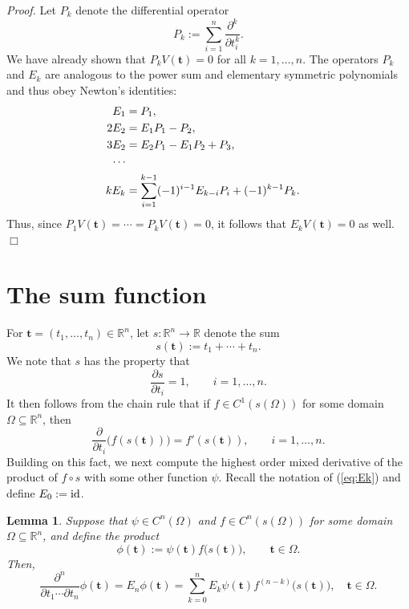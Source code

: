 \documentclass[12pt]{article}
\newcommand{\RR}{\mathbb{R}}
\def\bft{\mathbf{t}}
\newtheorem{lemma}{Lemma}
\newenvironment{proof}{\begin{trivlist}\item[]{\emph{Proof.}}}
               {\hfill$\Box$\end{trivlist}}
\begin{document}
\begin{proof}
Let $P_k$ denote the differential operator
$$ P_k := \sum_{i=1}^n \frac{\partial^k}{\partial t_i^k}. $$
We have already shown that $P_k V(\bft) = 0$ for all $k=1,\ldots,n$.
The operators $P_k$ and $E_k$ are analogous to the
power sum and elementary symmetric polynomials and thus
obey Newton's identities:
\begin{equation*}
\begin{aligned}
E_1 &= P_1, \cr
2E_2 &= E_1 P_1 - P_2, \cr
3E_2 &= E_2 P_1 - E_1 P_2 + P_3, \cr
\cdots \cr
k E_k &= \sum_{i=1}^{k-1} (-1)^{i-1} E_{k-i} P_i + (-1)^{k-1} P_k.
\end{aligned}
\end{equation*}
Thus, since $P_1V(\bft) = \cdots = P_kV(\bft) = 0$,
it follows that $E_kV(\bft) = 0$ as well.
\end{proof}

\section{The sum function}

For $\bft =(t_1,\ldots,t_n) \in \RR^n$, let $s: \RR^n \to \RR$ denote the sum
\begin{equation}\label{eq:s}
 s(\bft) := t_1 + \cdots + t_n.
\end{equation}
We note that $s$ has the property that
$$ \frac{\partial s}{\partial t_i} = 1, \qquad i=1,\ldots,n. $$
It then follows from the chain rule that if $f \in C^1(s(\Omega))$ for some
domain $\Omega \subseteq \RR^n$, then
$$ \frac{\partial}{\partial t_i} \big(f(s(\bft))\big)
  = f'(s(\bft)), \qquad i=1,\ldots,n. $$
Building on this fact, we next compute the highest order mixed derivative
of the product of $f \circ s$ with some other function $\psi$.
Recall the notation of (\ref{eq:Ek}) and define $E_0 := {\rm id}$.

\begin{lemma}\label{lem:chain}
Suppose that $\psi \in C^n(\Omega)$ and $f \in C^n(s(\Omega))$
for some domain $\Omega \subseteq \RR^n$, and define the product
$$ \phi(\bft) := \psi(\bft)f\big(s(\bft)\big), \qquad \bft \in \Omega. $$
Then,
\begin{equation}\label{eq:Echain}
\frac{\partial^n}{\partial t_1 \cdots \partial t_n} \phi(\bft)
= E_n\phi(\bft)
= \sum_{k=0}^n E_k \psi(\bft) f^{(n-k)}\big(s(\bft)\big), \quad \bft \in \Omega.
\end{equation}
\end{lemma}
\end{document}
